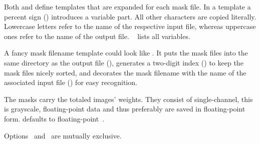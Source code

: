 \begin{codelist}
    Both  and 
    define templates that are expanded for each mask file.  In a template a percent sign
    (\sample{\%}) introduces a variable part.  All other characters are copied literally.
    Lowercase letters refer to the name of the respective input file, whereas uppercase ones
    refer to the name of the output file.  \tableName~
    lists all variables.

    A fancy mask filename template could look like .  It puts the
    mask files into the same directory as the output file (), generates a two-digit
    index () to keep the mask files nicely sorted, and decorates the mask filename
    with the name of the associated input file () for easy recognition.

    The masks carry the totaled images' weights.  They consist of single-channel, this is
    grayscale, floating-point data and thus preferably are saved in floating-point form.  \App{}
    defaults to floating-point~.

    Options~ and~ are mutually exclusive.
\fi
\end{codelist}


\ifenfuse
  
\fi



